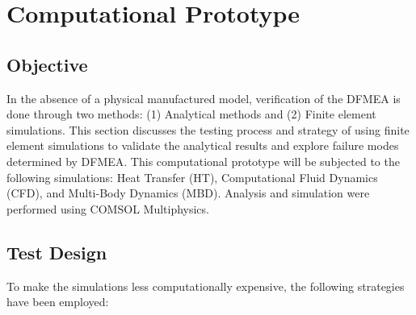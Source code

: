 \documentclass[12pt, letterpaper]{report}%
\newcounter{mycounter}           %
\newcounter{sub}[mycounter]      %
\begin{document}
\chapter{Computational Prototype}
\label{chap:test}

	\section{Objective}

		In the absence of a physical manufactured model, verification of the DFMEA is
		done through two methods: (1) Analytical methods and (2) Finite element
		simulations. This section discusses the testing process and strategy of using
		finite element simulations to validate the analytical results and explore
		failure modes determined by DFMEA. This computational prototype will be
		subjected to the following simulations: Heat Transfer (HT), Computational Fluid
		Dynamics (CFD), and Multi-Body Dynamics (MBD).
		Analysis and simulation were performed using COMSOL Multiphysics\cite{ref_COMSOL}.

	\section{Test Design}

		To make the simulations less computationally expensive, the following
		strategies have been employed:
\end{document}
